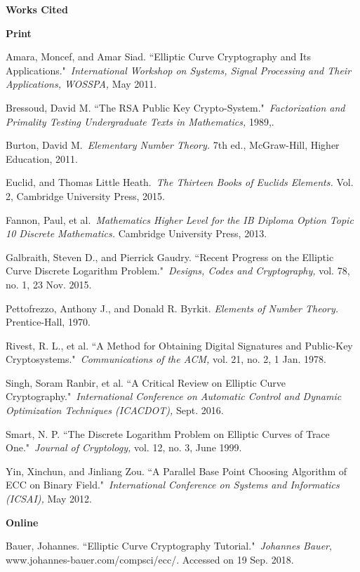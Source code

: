 \documentclass[a4paper,12pt]{article}
\theoremstyle{definition}
\begin{document}
\cleardoublepage
\textbf{\Large Works Cited}
\begin{flushleft}
\sloppy
\textbf{\large Print}

Amara, Moncef, and Amar Siad. ``Elliptic Curve Cryptography and Its Applications." \textit{International Workshop on Systems, Signal Processing and Their Applications, WOSSPA,} May 2011.

Bressoud, David M. ``The RSA Public Key Crypto-System." \textit{Factorization and Primality Testing Undergraduate Texts in Mathematics,} 1989,.

Burton, David M. \textit{Elementary Number Theory.} 7th ed., McGraw-Hill, Higher Education, 2011.

Euclid, and Thomas Little Heath. \textit{The Thirteen Books of Euclids Elements.} Vol. 2, Cambridge University Press, 2015.

Fannon, Paul, et al. \textit{Mathematics Higher Level for the IB Diploma Option Topic 10 Discrete Mathematics.} Cambridge University Press, 2013.

Galbraith, Steven D., and Pierrick Gaudry. ``Recent Progress on the Elliptic Curve Discrete Logarithm Problem." \textit{Designs, Codes and Cryptography,} vol. 78, no. 1, 23 Nov. 2015.

Pettofrezzo, Anthony J., and Donald R. Byrkit.\textit{ Elements of Number Theory.} Prentice-Hall, 1970.

Rivest, R. L., et al. ``A Method for Obtaining Digital Signatures and Public-Key Cryptosystems." \textit{Communications of the ACM,} vol. 21, no. 2, 1 Jan. 1978.

Singh, Soram Ranbir, et al. ``A Critical Review on Elliptic Curve Cryptography." \textit{International Conference on Automatic Control and Dynamic Optimization Techniques (ICACDOT),} Sept. 2016.

Smart, N. P. ``The Discrete Logarithm Problem on Elliptic Curves of Trace One." \textit{Journal of Cryptology,} vol. 12, no. 3, June 1999.

Yin, Xinchun, and Jinliang Zou. ``A Parallel Base Point Choosing Algorithm of ECC on Binary Field." \textit{International Conference on Systems and Informatics (ICSAI),} May 2012.
\newline

\textbf{\large Online}

Bauer, Johannes. ``Elliptic Curve Cryptography Tutorial." \textit{Johannes Bauer}, www.johannes-bauer.com/compsci/ecc/. Accessed on 19 Sep. 2018.


\end{flushleft}
\end{document}
